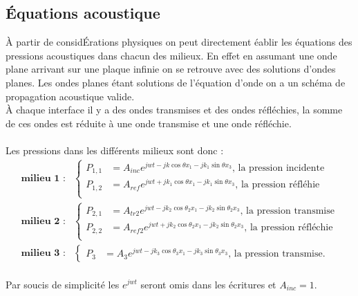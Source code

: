 \documentclass[12pt,foolscap]{report}
\begin{document}
\subsection*{Équations acoustique}
À partir de considÉrations physiques on peut directement éablir les équations des pressions acoustiques dans chacun des milieux. En effet en assumant une onde plane arrivant sur une plaque infinie on se retrouve avec des solutions d'ondes planes. Les ondes planes étant solutions de l'équation d'onde on a un schéma de propagation acoustique valide.\\ 
À chaque interface il y a des ondes transmises et des ondes réfléchies, la somme de ces ondes est réduite à une onde transmise et une onde réfléchie.\\ \\
Les pressions dans les différents milieux sont donc : 
\begin{align}
\textbf{milieu 1 :} &
\begin{cases}
P_{1,1} &= A_{inc}e^{jwt-jk\cos\theta x_1-jk_1\sin\theta x_3} \text{, la pression incidente}\\
P_{1,2} &= A_{ref}e^{jwt+jk_1\cos\theta x_1-jk_1\sin\theta x_3}\text{, la pression réfléhie}\\
\end{cases}\\
\textbf{milieu 2 :} &
\begin{cases}
P_{2,1} &= A_{tr2}e^{jwt-jk_2\cos\theta_2 x_1-jk_2\sin\theta_2 x_3} \text{, la pression transmise}\\
P_{2,2} &= A_{ref2}e^{jwt+jk_2\cos\theta_2 x_1-jk_2\sin\theta_2 x_3}\text{, la pression réfléchie}\\
\end{cases}\\
\textbf{milieu 3 :} &
\begin{cases}
P_{3} &= A_{3}e^{jwt-jk_3\cos\theta_3 x_1-jk_3\sin\theta_3 x_3} \text{, la pression transmise.}
\end{cases}
\end{align}\\
Par soucis de simplicité les $e^{jwt}$ seront omis dans les écritures et $A_{inc}=1$.
\end{document}
